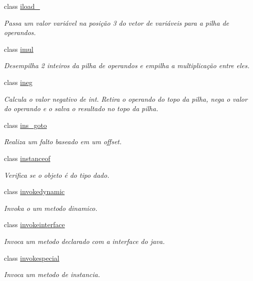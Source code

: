 \begin{DoxyCompactItemize}
class \hyperlink{class_instruction_impl_1_1iload__3}{iload\+\_}
\begin{DoxyCompactList}\small\item\em Passa um valor variável na posição 3 do vetor de variáveis para a pilha de operandos. \end{DoxyCompactList}\item 
class \hyperlink{class_instruction_impl_1_1imul}{imul}
\begin{DoxyCompactList}\small\item\em Desempilha 2 inteiros da pilha de operandos e empilha a multiplicação entre eles. \end{DoxyCompactList}\item 
class \hyperlink{class_instruction_impl_1_1ineg}{ineg}
\begin{DoxyCompactList}\small\item\em Calcula o valor negativo de int. Retira o operando do topo da pilha, nega o valor do operando e o salva o resultado no topo da pilha. \end{DoxyCompactList}\item 
class \hyperlink{class_instruction_impl_1_1ins__goto}{ins\+\_\+goto}
\begin{DoxyCompactList}\small\item\em Realiza um falto baseado em um offset. \end{DoxyCompactList}\item 
class \hyperlink{class_instruction_impl_1_1instanceof}{instanceof}
\begin{DoxyCompactList}\small\item\em Verifica se o objeto é do tipo dado. \end{DoxyCompactList}\item 
class \hyperlink{class_instruction_impl_1_1invokedynamic}{invokedynamic}
\begin{DoxyCompactList}\small\item\em Invoka o um metodo dinamico. \end{DoxyCompactList}\item 
class \hyperlink{class_instruction_impl_1_1invokeinterface}{invokeinterface}
\begin{DoxyCompactList}\small\item\em Invoca um metodo declarado com a interface do java. \end{DoxyCompactList}\item 
class \hyperlink{class_instruction_impl_1_1invokespecial}{invokespecial}
\begin{DoxyCompactList}\small\item\em Invoca um metodo de instancia. \end{DoxyCompactList}\item 

\end{DoxyCompactItemize}
